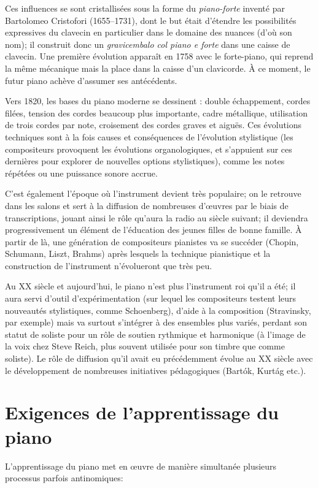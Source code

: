 Ces influences se sont cristallisées sous la forme du \emph{piano-forte} inventé par Bartolomeo Cristofori (1655--1731), dont le but était d'étendre les possibilités expressives du clavecin en particulier dans le domaine des nuances (d'où son nom); il construit donc un \emph{gravicembalo col piano e forte} dans une caisse de clavecin. Une première \og{}évolution \fg{} apparaît en 1758 avec le forte-piano, qui reprend la même mécanique mais la place dans la caisse d'un clavicorde. À ce moment, le futur piano achève d'assumer ses antécédents.

Vers 1820, les bases du piano moderne se dessinent : double échappement, cordes filées, tension des cordes beaucoup plus importante, cadre métallique, utilisation de trois cordes par note, croisement des cordes graves et aiguës. Ces évolutions techniques sont à la fois causes et conséquences de l'évolution stylistique (les compositeurs provoquent les évolutions organologiques, et s'appuient sur ces dernières pour explorer de nouvelles options stylistiques), comme les notes répétées ou une puissance sonore accrue.

C'est également l'époque où l'instrument devient très populaire; on le retrouve dans les salons et sert à la diffusion de nombreuses d'\oe{}uvres par le biais de transcriptions, jouant ainsi le rôle qu'aura la radio au siècle suivant; il deviendra progressivement un élément de l'éducation des jeunes filles de bonne famille. À partir de là, une génération de compositeurs pianistes va se succéder (Chopin, Schumann, Liszt, Brahms) après lesquels la technique pianistique et la construction de l'instrument n'évolueront que très peu.

Au XX\ieme{} siècle et aujourd'hui, le piano n'est plus l'instrument roi qu'il a été; il aura servi d'outil d'expérimentation (sur lequel les compositeurs testent leurs nouveautés stylistiques, comme Schoenberg), d'aide à la composition (Stravinsky, par exemple) mais va surtout s'intégrer à des ensembles plus variés, perdant son statut de soliste pour un rôle de soutien rythmique et harmonique (à l'image de la voix chez Steve Reich, plus souvent utilisée pour son timbre que comme soliste). Le rôle de diffusion qu'il avait eu précédemment évolue au XX\ieme{} siècle avec le développement de nombreuses initiatives pédagogiques (Bartók, Kurtág etc.).

\section*{Exigences de l'apprentissage du piano}
L'apprentissage du piano met en \oe{}uvre de manière simultanée plusieurs processus parfois antinomiques:

